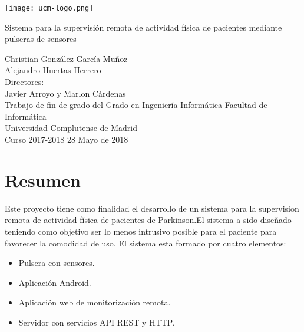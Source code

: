 \begin{titlepage}
	\centering
    \texttt{[image: ucm-logo.png]}
    \vskip 1cm
    
    \centering
    {\huge Sistema para la supervisión remota de actividad física de pacientes mediante pulseras de sensores 
    }
    \newline
    \newline
    \newline
    \newline
    
	\centering \large { Christian González García-Muñoz \\  Alejandro Huertas Herrero \\ 
    					\bigskip Directores: \\ Javier Arroyo y Marlon Cárdenas \\ \bigskip}
    \vskip 1cm
    \centering \Large { Trabajo de fin de grado del Grado en Ingeniería Informática }
	\vskip 1cm
    \centering \large {Facultad de Informática \\ Universidad Complutense de Madrid \\ Curso 2017-2018}
    \vskip 0.5cm
    \centering \large {28	 Mayo de 2018}

\end{titlepage}
\clearpage
\vphantom{a}
\newpage


\section*{Resumen}

Este proyecto tiene como finalidad el desarrollo de un sistema para la supervision remota de actividad física de pacientes de Parkinson.El sistema a sido diseñado teniendo como objetivo ser lo menos intrusivo posible para el paciente para favorecer la comodidad de uso. El sistema esta formado por cuatro elementos:

\begin{itemize}
    \item Pulsera con sensores. 
	\item Aplicación Android. 
	\item Aplicación web de monitorización remota.
    \item Servidor con servicios API REST y HTTP.
    \newline
\end{itemize}

